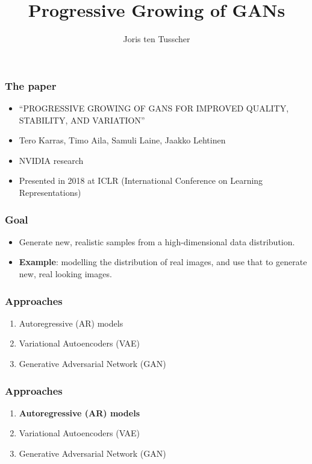 \documentclass[xcolor=dvipsnames]{beamer}
\title{Progressive Growing of GANs}
\author{Joris ten Tusscher}
\begin{document}
\frame{\titlepage}



\begin{frame}
\frametitle{The paper}
\begin{itemize}
	\item ``PROGRESSIVE GROWING OF GANS FOR IMPROVED QUALITY, STABILITY, AND VARIATION''\cite{karras2017progressive}
	\item Tero Karras, Timo Aila, Samuli Laine, Jaakko Lehtinen
	\item NVIDIA research
	\item Presented in 2018 at ICLR (International Conference on Learning Representations)
\end{itemize}
\end{frame}



\begin{frame}
\frametitle{Goal}
\begin{itemize}
	\item Generate new, realistic samples from a high-dimensional data distribution.
	\item \textbf{Example}: modelling the distribution of real images, and use that to generate new, real looking images.
\end{itemize}
\end{frame}



\begin{frame}
\frametitle{Approaches}
\begin{enumerate}
	\item Autoregressive (AR) models
	\item Variational Autoencoders (VAE)
	\item Generative Adversarial Network (GAN)
\end{enumerate}
\end{frame}



\begin{frame}
\frametitle{Approaches}
\begin{enumerate}
	\item \textbf{Autoregressive (AR) models}
	\item Variational Autoencoders (VAE)
	\item Generative Adversarial Network (GAN)
\end{enumerate}
\end{frame}
\end{document}

